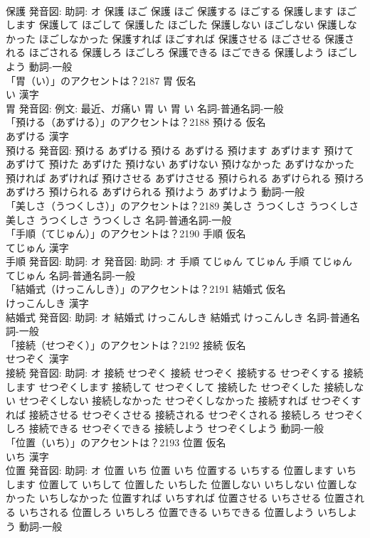 \documentclass[8pt]{extreport}
\begin{document}
\begin{CJK}{UTF8}{min}
\\	保護 発音図: 助詞: オ	保護 ほご		保護 ほご 保護する ほごする 保護します ほごします 保護して ほごして 保護した ほごした 保護しない ほごしない 保護しなかった ほごしなかった 保護すれば ほごすれば 保護させる ほごさせる 保護される ほごされる 保護しろ ほごしろ 保護できる ほごできる 保護しよう ほごしよう				動詞-一般 
\\	「胃（い）」のアクセントは？2187	胃 仮名　
\\	い 漢字　
\\	胃 発音図: 例文: 最近、ガ痛い	胃 い		胃 い				名詞-普通名詞-一般 
\\	「預ける（あずける）」のアクセントは？2188	預ける 仮名　
\\	あずける 漢字　
\\	預ける 発音図:	預ける あずける		預ける あずける 預けます あずけます 預けて あずけて 預けた あずけた 預けない あずけない 預けなかった あずけなかった 預ければ あずければ 預けさせる あずけさせる 預けられる あずけられる 預けろ あずけろ 預けられる あずけられる 預けよう あずけよう				動詞-一般 
\\	「美しさ（うつくしさ）」のアクセントは？2189		美しさ うつくしさ うつくしさ		美しさ うつくしさ うつくしさ				名詞-普通名詞-一般 
\\	「手順（てじゅん）」のアクセントは？2190	手順 仮名　
\\	てじゅん 漢字　
\\	手順 発音図: 助詞: オ 発音図: 助詞: オ	手順 てじゅん てじゅん		手順 てじゅん てじゅん				名詞-普通名詞-一般 
\\	「結婚式（けっこんしき）」のアクセントは？2191	結婚式 仮名　
\\	けっこんしき 漢字　
\\	結婚式 発音図: 助詞: オ	結婚式 けっこんしき		結婚式 けっこんしき				名詞-普通名詞-一般 
\\	「接続（せつぞく）」のアクセントは？2192	接続 仮名　
\\	せつぞく 漢字　
\\	接続 発音図: 助詞: オ	接続 せつぞく		接続 せつぞく 接続する せつぞくする 接続します せつぞくします 接続して せつぞくして 接続した せつぞくした 接続しない せつぞくしない 接続しなかった せつぞくしなかった 接続すれば せつぞくすれば 接続させる せつぞくさせる 接続される せつぞくされる 接続しろ せつぞくしろ 接続できる せつぞくできる 接続しよう せつぞくしよう				動詞-一般 
\\	「位置（いち）」のアクセントは？2193	位置 仮名　
\\	いち 漢字　
\\	位置 発音図: 助詞: オ	位置 いち		位置 いち 位置する いちする 位置します いちします 位置して いちして 位置した いちした 位置しない いちしない 位置しなかった いちしなかった 位置すれば いちすれば 位置させる いちさせる 位置される いちされる 位置しろ いちしろ 位置できる いちできる 位置しよう いちしよう				動詞-一般 

\end{CJK}
\end{document}
